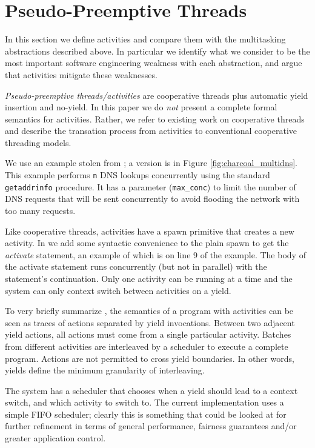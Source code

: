 \documentclass[9pt,preprint]{sigplanconf-2}
\begin{document}
\section{Pseudo-Preemptive Threads}

In this section we define activities and compare them with the multitasking abstractions described above.
In particular we identify what we consider to be the most important software engineering weakness with each abstraction, and argue that activities mitigate these weaknesses.

\emph{Pseudo-preemptive threads\slash{}activities} are cooperative threads plus automatic yield insertion and no-yield.
In this paper we do \emph{not} present a complete formal semantics for activities.
Rather, we refer to existing work on cooperative threads \cite{Abadi2009} and describe the transation process from activities to conventional cooperative threading models.

We use an example stolen from \cite{Krohn2007}; a \charcoal{} version is in Figure \ref{fig:charcoal_multidns}.
This example performs \texttt{n} DNS lookups concurrently using the standard \texttt{getaddrinfo} procedure.
It has a parameter (\texttt{max\_conc}) to limit the number of DNS requests that will be sent concurrently to avoid flooding the network with too many requests.

Like cooperative threads, activities have a spawn primitive that creates a new activity.
In \charcoal{} we add some syntactic convenience to the plain spawn to get the \emph{activate} statement, an example of which is on line 9 of the example.
The body of the activate statement runs concurrently (but not in parallel) with the statement's continuation.
Only one activity can be running at a time and the system can only context switch between activities on a yield.

To very briefly summarize \cite{Abadi2009}, the semantics of a program with activities can be seen as traces of actions separated by yield invocations.
Between two adjacent yield actions, all actions must come from a single particular activity.
Batches from different activities are interleaved by a scheduler to execute a complete program.
Actions are not permitted to cross yield boundaries.
In other words, yields define the minimum granularity of interleaving.

The system has a scheduler that chooses when a yield should lead to a context switch, and which activity to switch to.
The current \charcoal{} implementation uses a simple FIFO scheduler; clearly this is something that could be looked at for further refinement in terms of general performance, fairness guarantees and/or greater application control.
\end{document}
